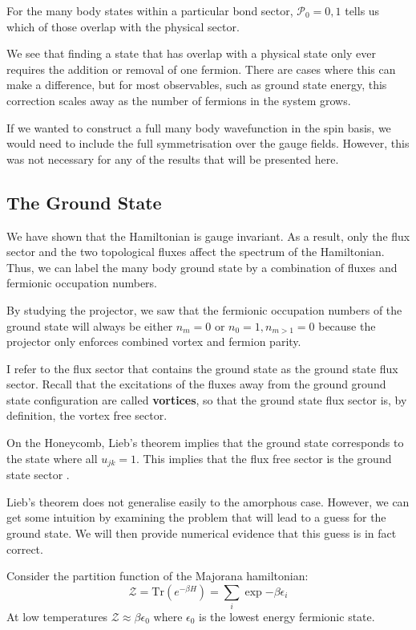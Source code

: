 For the many body states within a particular bond sector, \(\mathcal{P}_0 = 0,1\) tells us which of those overlap with the physical sector.

We see that finding a state that has overlap with a physical state only ever requires the addition or removal of one fermion. There are cases where this can make a difference, but for most observables, such as ground state energy, this correction scales away as the number of fermions in the system grows.

If we wanted to construct a full many body wavefunction in the spin basis, we would need to include the full symmetrisation over the gauge fields. However, this was not necessary for any of the results that will be presented here.

\hypertarget{the-ground-state}{%
\subsection{The Ground State}\label{the-ground-state}}

We have shown that the Hamiltonian is gauge invariant. As a result, only the flux sector and the two topological fluxes affect the spectrum of the Hamiltonian. Thus, we can label the many body ground state by a combination of fluxes and fermionic occupation numbers.

By studying the projector, we saw that the fermionic occupation numbers of the ground state will always be either \(n_m = 0\) or \(n_0 = 1, n_{m>1} = 0\) because the projector only enforces combined vortex and fermion parity.

I refer to the flux sector that contains the ground state as the ground state flux sector. Recall that the excitations of the fluxes away from the ground ground state configuration are called \textbf{vortices}, so that the ground state flux sector is, by definition, the vortex free sector.

On the Honeycomb, Lieb's theorem implies that the ground state corresponds to the state where all \(u_{jk} = 1\). This implies that the flux free sector is the ground state sector \textcite{lieb_flux_1994}.

Lieb's theorem does not generalise easily to the amorphous case. However, we can get some intuition by examining the problem that will lead to a guess for the ground state. We will then provide numerical evidence that this guess is in fact correct.

Consider the partition function of the Majorana hamiltonian: \[ \mathcal{Z} = \mathrm{Tr}\left( e^{-\beta H}\right) = \sum_i \exp{-\beta \epsilon_i}\] At low temperatures \(\mathcal{Z} \approx \beta \epsilon_0\) where \(\epsilon_0\) is the lowest energy fermionic state.

